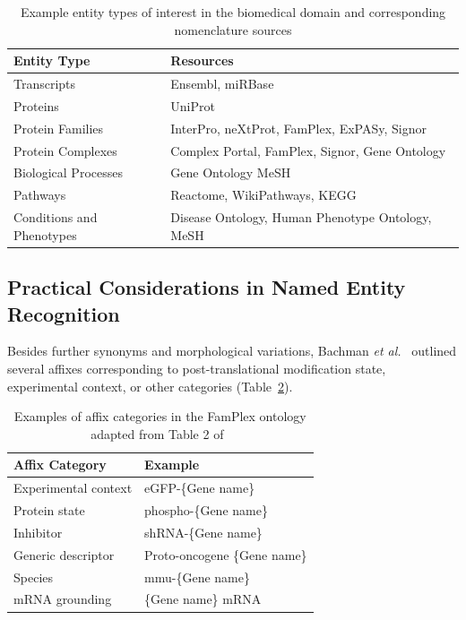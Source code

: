 \begin{table}
    \centering
    \caption{Example entity types of interest in the biomedical domain and corresponding nomenclature sources}
    \label{tab:other_nomenclature_databases}
    \begin{tabular}{ l l }
        Entity Type & Resources \\
        \hline
        Transcripts & Ensembl, miRBase \\
        Proteins & UniProt \\
        Protein Families & InterPro, neXtProt, FamPlex, ExPASy, Signor \\
        Protein Complexes & Complex Portal, FamPlex, Signor, Gene Ontology \\
        Biological Processes & Gene Ontology MeSH \\
        Pathways & Reactome, WikiPathways, KEGG \\
        Conditions and Phenotypes & Disease Ontology, Human Phenotype Ontology, MeSH
    \end{tabular}
\end{table}

\subsection{Practical Considerations in Named Entity Recognition}

Besides further synonyms and morphological variations, Bachman \textit{et al.}~\cite{Bachman2018} outlined several affixes corresponding to post-translational modification state, experimental context, or other categories (Table~\ref{tab:affix_categories}).

\begin{table}
    \centering
    \caption{Examples of affix categories in the FamPlex ontology adapted from Table 2 of~\cite{Bachman2018}}
    \label{tab:affix_categories}
    \begin{tabular}{ l l }
        Affix Category & Example \\
        \hline
        Experimental context & eGFP-\{Gene name\} \\
        Protein state & phospho-\{Gene name\} \\
        Inhibitor & shRNA-\{Gene name\} \\
        Generic descriptor & Proto-oncogene \{Gene name\} \\
        Species & mmu-\{Gene name\} \\
        mRNA grounding & \{Gene name\} mRNA
    \end{tabular}
\end{table}


